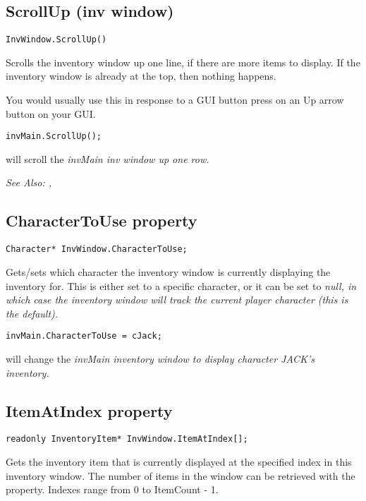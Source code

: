\subsection{ScrollUp (inv window)}\label{InvWindow.ScrollUp}%

\begin{verbatim}
InvWindow.ScrollUp()
\end{verbatim}
Scrolls the inventory window up one line, if there are more items to display.
If the inventory window is already at the top, then nothing happens.

You would usually use this in response to a GUI button press on an Up arrow button
on your GUI.

\begin{verbatim}
invMain.ScrollUp();
\end{verbatim}
will scroll the \it{invMain} inv window up one row.

\it{See Also:} ,


\subsection{CharacterToUse property}\label{InvWindow.CharacterToUse}%

\begin{verbatim}
Character* InvWindow.CharacterToUse;
\end{verbatim}
Gets/sets which character the inventory window is currently displaying the inventory
for. This is either set to a specific character, or it can be set to \it{null}, in which
case the inventory window will track the current player character (this is the default).

\begin{verbatim}
invMain.CharacterToUse = cJack;
\end{verbatim}
will change the \it{invMain} inventory window to display character JACK's inventory.


\subsection{ItemAtIndex property}\label{InvWindow.ItemAtIndex}%

\begin{verbatim}
readonly InventoryItem* InvWindow.ItemAtIndex[];
\end{verbatim}
Gets the inventory item that is currently displayed at the specified index in this
inventory window. The number of items in the window can be retrieved with the
 property. Indexes range from 0 to ItemCount - 1.

